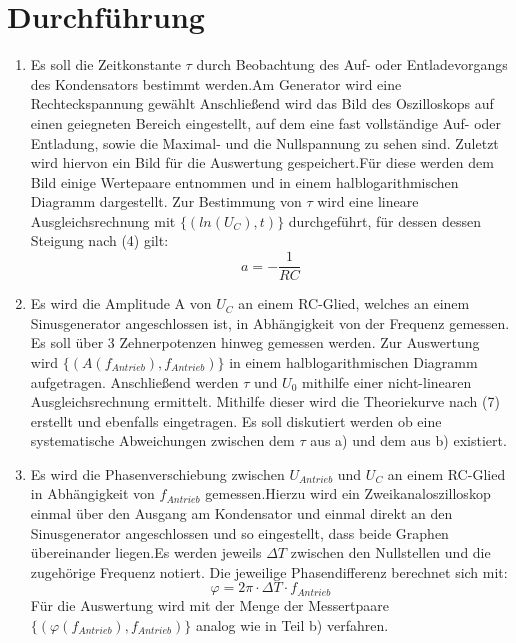 \section{Durchführung}
\label{sec:Durchführung}
\renewcommand{\labelenumi}{\alph{enumi})}
\begin{enumerate}
  \item Es soll die Zeitkonstante $\tau$ durch Beobachtung des Auf- oder Entladevorgangs
  des Kondensators bestimmt werden.Am Generator wird eine Rechteckspannung gewählt
  Anschließend wird das Bild des Oszilloskops auf einen
  geiegneten Bereich eingestellt, auf dem eine fast vollständige Auf- oder Entladung, sowie
  die Maximal- und die Nullspannung zu sehen sind. Zuletzt wird hiervon ein Bild für die
  Auswertung gespeichert.Für diese werden dem Bild einige Wertepaare entnommen und in einem
  halblogarithmischen Diagramm dargestellt. Zur Bestimmung von $\tau$ wird eine
  lineare Ausgleichsrechnung mit $\{(ln(U_C), t)\}$ durchgeführt, für dessen dessen Steigung nach (4) gilt:
  \begin{equation}
  a = -\frac{1}{RC}
  \end{equation}

  \item Es wird die Amplitude A von $U_C$ an einem RC-Glied, welches an einem Sinusgenerator
   angeschlossen ist, in Abhängigkeit von der Frequenz gemessen. Es soll über
   3 Zehnerpotenzen hinweg gemessen werden. Zur Auswertung wird $\{(A(f_{Antrieb}), f_{Antrieb})\}$
   in einem halblogarithmischen Diagramm aufgetragen. Anschließend werden $\tau$ und $U_0$ mithilfe einer nicht-linearen
    Ausgleichsrechnung ermittelt. Mithilfe dieser wird die Theoriekurve nach (7) erstellt und
    ebenfalls eingetragen. Es soll diskutiert werden ob eine systematische Abweichungen
    zwischen dem $\tau$ aus a) und dem aus b) existiert.



    \item Es wird die Phasenverschiebung zwischen $U_{Antrieb}$ und $U_C$ an einem
    RC-Glied in Abhängigkeit von $f_{Antrieb}$ gemessen.Hierzu wird ein Zweikanaloszilloskop
    einmal über den Ausgang am Kondensator und einmal direkt an den Sinusgenerator angeschlossen
     und so eingestellt, dass beide Graphen übereinander liegen.Es werden jeweils
      $\Delta T$ zwischen den Nullstellen und die zugehörige Frequenz notiert. Die jeweilige
       Phasendifferenz berechnet sich mit:
       \begin{equation}
         \varphi = 2 \pi \cdot \Delta T \cdot f_{Antrieb}
       \end{equation}
       Für die Auswertung wird mit der Menge der Messertpaare $\{(\varphi(f_{Antrieb}),f_{Antrieb})\}$
       analog wie in Teil b) verfahren.


\end{enumerate}
